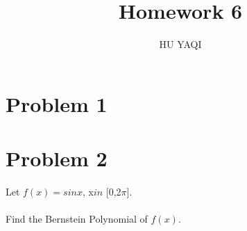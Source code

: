 \documentclass{article}
\title{ Homework 6 }
\author{HU YAQI}
\begin{document}
\maketitle
\setlength{\parindent}{0pt}

\section{ Problem 1 }

\section{ Problem 2 }
Let $f(x)=sinx$,  x$in$ [0,2$\pi$].\\
\\
Find the Bernstein Polynomial of $f(x)$.
\end{document}
